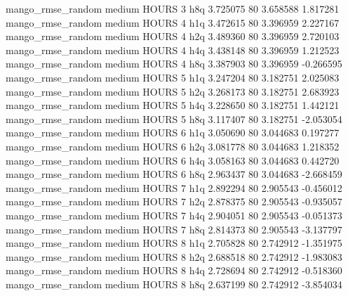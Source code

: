 mango_rmse_random     medium    HOURS                 3                  h8q  3.725075 80       3.658588           1.817281
mango_rmse_random     medium    HOURS                 4                  h1q  3.472615 80       3.396959           2.227167
mango_rmse_random     medium    HOURS                 4                  h2q  3.489360 80       3.396959           2.720103
mango_rmse_random     medium    HOURS                 4                  h4q  3.438148 80       3.396959           1.212523
mango_rmse_random     medium    HOURS                 4                  h8q  3.387903 80       3.396959          -0.266595
mango_rmse_random     medium    HOURS                 5                  h1q  3.247204 80       3.182751           2.025083
mango_rmse_random     medium    HOURS                 5                  h2q  3.268173 80       3.182751           2.683923
mango_rmse_random     medium    HOURS                 5                  h4q  3.228650 80       3.182751           1.442121
mango_rmse_random     medium    HOURS                 5                  h8q  3.117407 80       3.182751          -2.053054
mango_rmse_random     medium    HOURS                 6                  h1q  3.050690 80       3.044683           0.197277
mango_rmse_random     medium    HOURS                 6                  h2q  3.081778 80       3.044683           1.218352
mango_rmse_random     medium    HOURS                 6                  h4q  3.058163 80       3.044683           0.442720
mango_rmse_random     medium    HOURS                 6                  h8q  2.963437 80       3.044683          -2.668459
mango_rmse_random     medium    HOURS                 7                  h1q  2.892294 80       2.905543          -0.456012
mango_rmse_random     medium    HOURS                 7                  h2q  2.878375 80       2.905543          -0.935057
mango_rmse_random     medium    HOURS                 7                  h4q  2.904051 80       2.905543          -0.051373
mango_rmse_random     medium    HOURS                 7                  h8q  2.814373 80       2.905543          -3.137797
mango_rmse_random     medium    HOURS                 8                  h1q  2.705828 80       2.742912          -1.351975
mango_rmse_random     medium    HOURS                 8                  h2q  2.688518 80       2.742912          -1.983083
mango_rmse_random     medium    HOURS                 8                  h4q  2.728694 80       2.742912          -0.518360
mango_rmse_random     medium    HOURS                 8                  h8q  2.637199 80       2.742912          -3.854034
